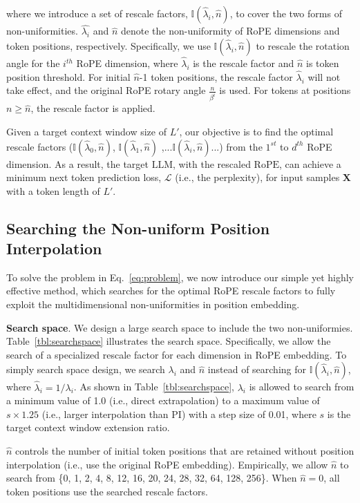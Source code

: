 where we introduce a set of rescale factors, $\mathbb{I}(\hat{\lambda}_{i},\hat{n})$,  to cover the two forms of non-uniformities.  $\hat{\lambda_i}$  and $\hat{n}$ denote the non-uniformity of RoPE dimensions and token positions, respectively. Specifically, we use $\mathbb{I}(\hat{\lambda}_{i},\hat{n})$  to rescale the rotation angle for the $i^{th}$ RoPE dimension, where $\hat\lambda_{i}$ is the rescale factor and $\hat{n}$ is token position threshold. For initial $\hat{n}$-1 token positions, the rescale factor $\hat\lambda_{i}$ will not take effect, and the original RoPE rotary angle $\frac{n}{\beta^i}$ is used. For tokens at positions $n\ge\hat{n}$, the rescale factor is applied. 

Given a target context window size of $L'$, our objective is to find the optimal rescale factors ($\mathbb{I}(\hat{\lambda}_{0},\hat{n})$, $\mathbb{I}(\hat{\lambda}_{1},\hat{n})$ ,...$\mathbb{I}(\hat{\lambda}_{i},\hat{n})$...) from the $1^{st}$ to $d^{th}$ RoPE dimension. As a result, the target $\text{LLM}$, with the rescaled $\text{RoPE}$, can achieve a minimum next token prediction loss, $\mathcal{L}$ (i.e., the perplexity), for input samples $\mathbf{X}$ with a token length of $L'$. 

\subsection{Searching the Non-uniform Position Interpolation}

To solve the problem in Eq.~\ref{eq:problem}, we now introduce our simple yet highly effective method, which searches for the optimal RoPE rescale factors to fully exploit the multidimensional non-uniformities in position embedding. 

\textbf{Search space}. We  design a large search space to include the two non-uniformies.  Table~\ref{tbl:searchspace} illustrates the search space.  Specifically, we allow the search of a specialized rescale factor for each dimension in RoPE embedding. To simply search space design, we search $\lambda_i$ and $\hat{n}$ instead of searching for $\mathbb{I}(\hat{\lambda}_{i},\hat{n})$, where  $\hat{\lambda}_{i}=1/\lambda_i$. 
 As shown in Table~\ref{tbl:searchspace}, $\lambda_i$ is allowed to search from a minimum value of 1.0 (i.e., direct extrapolation) to a maximum value of $s\times1.25$ (i.e., larger interpolation than PI) with a step size of 0.01, where $s$ is the target context window extension ratio.

$\hat{n}$ controls the number of initial token positions that are retained without position interpolation (i.e., use the original RoPE embedding). Empirically, we allow $\hat{n}$ to search from \{0, 1, 2, 4, 8, 12, 16, 20, 24, 28, 32, 64, 128, 256\}. When $\hat{n}=0$, all token positions use the searched rescale factors.

